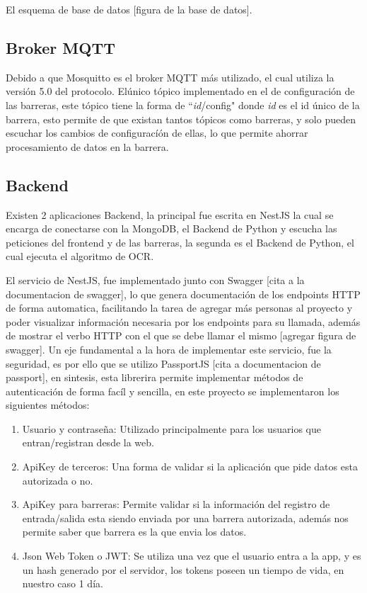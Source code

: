 El esquema de base de datos [figura de la base de datos].

\subsection{Broker MQTT}

Debido a que Mosquitto es el broker MQTT más utilizado, el cual utiliza la versión 5.0 del protocolo. Elúnico tópico implementado en el de configuración de las barreras, este tópico tiene la forma de ``\textit{id}/config" donde \textit{id} es el id único de la barrera, esto permite de que existan tantos tópicos como barreras, y solo pueden escuchar los cambios de configuracíón de ellas, lo que permite ahorrar procesamiento de datos en la barrera.

\subsection{Backend}

Existen 2 aplicaciones Backend, la principal fue escrita en NestJS \cite{noauthor_documentacion_nodate} la cual se encarga de conectarse con la MongoDB, el Backend de Python y escucha las peticiones del frontend y de las barreras, la segunda es el Backend de Python, el cual ejecuta el algoritmo de OCR.

El servicio de NestJS, fue implementado junto con Swagger [cita  a la documentacion de swagger], lo que genera documentación de los endpoints HTTP de forma automatica, facilitando la tarea de agregar más personas al proyecto y poder visualizar información necesaria por los endpoints para su llamada, además de mostrar el verbo HTTP con el que se debe llamar el mismo [agregar figura de swagger]. Un eje fundamental a la hora de implementar este servicio, fue la seguridad, es por ello que se utilizo PassportJS [cita a documentacion de passport], en sintesis, esta librerira permite implementar métodos de autenticación de forma facíl y sencilla, en este proyecto se implementaron los siguientes métodos:

\begin{enumerate}
    \item Usuario y contraseña: Utilizado principalmente para los usuarios que entran/registran desde la web.
    \item ApiKey de terceros: Una forma de validar si la aplicación que pide datos esta autorizada o no.
    \item ApiKey para barreras: Permite validar si la información del registro de entrada/salida esta siendo enviada por una barrera autorizada, además nos permite saber que barrera es la que envia los datos.
    \item Json Web Token o JWT: Se utiliza una vez que el usuario entra a la app, y es un hash generado por el servidor, los tokens poseen un tiempo de vida, en nuestro caso 1 día.
\end{enumerate}

